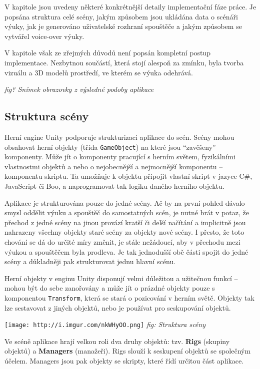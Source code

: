 V kapitole jsou uvedeny některé konkrétnější detaily implementační fáze
práce. Je popsána struktura celé scény, jakým způsobem jsou ukládána
data o scénáři výuky, jak je generováno uživatelské rozhraní spouštěče a
jakým způsobem se vytvářel voice-over výuky.

V kapitole však ze zřejmých důvodů není popsán kompletní postup
implementace. Nezbytnou součástí, která stojí alespoň za zmínku, byla
tvorba vizuálu a 3D modelů prostředí, ve kterém se výuka odehrává.

\emph{fig? Snímek obrazovky z výsledné podoby aplikace}

\subsection{Struktura scény}\label{struktura-scuxe9ny}

Herní engine Unity podporuje strukturizaci aplikace do scén. Scény mohou
obsahovat herní objekty (třída \texttt{GameObject}) na které jsou
``zavěšeny'' komponenty. Může jít o komponenty pracující s herním
světem, fyzikálními vlastnostmi objektů a nebo o nejobecnější a
nejmocnější komponentu -- komponentu skriptu. Ta umožňuje k objektu
připojit vlastní skript v jazyce C\#, JavaScript či Boo, a naprogramovat
tak logiku daného herního objektu.

Aplikace je strukturována pouze do jedné scény. Ač by na první pohled
dávalo smysl oddělit výuku a spouštěč do samostatných scén, je nutné
brát v potaz, že přechod z jedné scény na jinou provází kratší či delší
načítání a implicitně jsou nahrazeny všechny objekty staré scény za
objekty nové scény. I přesto, že toto chování se dá do určité míry
změnit, je stále nežádoucí, aby v přechodu mezi výukou a spouštěčem
byla prodleva. Je tak jednodušší obě části spojit do jedné scény a
důkladněji pak strukturovat jednu hlavní scénu.

Herní objekty v enginu Unity disponují velmi důležitou a užitečnou
funkcí -- mohou být do sebe zanořovány a může jít o prázdné objekty
pouze s komponentou \texttt{Transform}, která se stará o pozicování v
herním světě. Objekty tak lze sestavovat z jiných objektů, nebo je
používat pro seskupování objektů.

\texttt{[image: http://i.imgur.com/nkWHyOO.png]} \emph{fig: Struktura
scény}

Ve scéně aplikace hrají velkou roli dva druhy objektů: tzv.
\textbf{Rigs} (skupiny objektů) a \textbf{Managers} (manažeři). Rigs
slouží k seskupení objektů se společným účelem. Managers jsou pak
objekty se skripty, které řídí určitou část aplikace.


